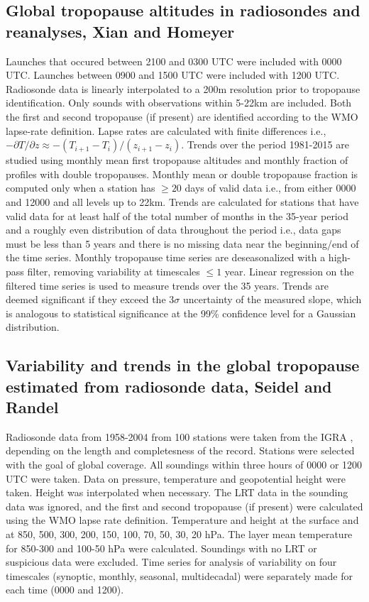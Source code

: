 \documentclass[fleqn,10pt]{wlscirep}
\begin{document}
\subsection*{Global tropopause altitudes in radiosondes and reanalyses, Xian and Homeyer\cite{xian2019global}}
Launches that occured between 2100 and 0300 UTC were included with 0000 UTC. Launches between 0900 and 1500 UTC were included with 1200 UTC. Radiosonde data is linearly interpolated to a 200m resolution prior to tropopause identification. Only sounds with observations within 5-22km are included. Both the first and second tropopause (if present) are identified according to the WMO lapse-rate definition. Lapse rates are calculated with finite differences i.e., $-\partial T/\partial z \approx -(T_{i+1} - T_i)/(z_{i+1} - z_i)$. Trends over the period 1981-2015 are studied using monthly mean first tropopause altitudes and monthly fraction of profiles with double tropopauses. Monthly mean or double tropopause fraction is computed only when a station has $\geq 20$ days of valid data i.e., from either 0000 and 12000 and all levels up to 22km. Trends are calculated for stations that have valid data for at least half of the total number of months in the 35-year period and a roughly even distribution of data throughout the period i.e., data gaps must be less than 5 years and there is no missing data near the beginning/end of the time series. Monthly tropopause time series are deseasonalized with a high-pass filter, removing variability at timescales $\leq 1$ year. Linear regression on the filtered time series is used to measure trends over the 35 years. Trends are deemed significant if they exceed the 3$\sigma$ uncertainty of the measured slope, which is analogous to statistical significance at the 99\% confidence level for a
Gaussian distribution.


\subsection*{Variability and trends in the global tropopause estimated from radiosonde data, Seidel and Randel\cite{seidel2006variability}}
Radiosonde data from 1958-2004 from 100 stations were taken from the IGRA \cite{durre2006overview}, depending on the length and completesness of the record. Stations were selected with the goal of global coverage. All soundings within three hours of 0000 or 1200 UTC were taken. Data on pressure, temperature and geopotential height were taken. Height was interpolated when necessary. The LRT data in the sounding data was ignored, and the first and second tropopause (if present) were calculated using the WMO lapse rate definition. Temperature and height at the surface and at 850, 500, 300, 200, 150, 100, 70, 50, 30, 20 hPa. The layer mean temperature for 850-300 and 100-50 hPa were calculated. Soundings with no LRT or suspicious data were excluded. Time series for analysis of variability on four timescales (synoptic, monthly, seasonal, multidecadal) were separately made for each time (0000 and 1200). 
\end{document}
